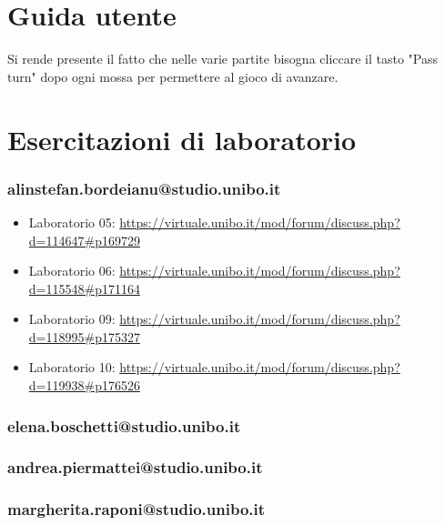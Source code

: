 \documentclass[a4paper,12pt]{report}
\begin{document}
\appendix

\chapter{Guida utente}

Si rende presente il fatto che nelle varie partite bisogna cliccare il tasto "Pass turn" dopo ogni mossa per permettere al gioco di avanzare.

\chapter{Esercitazioni di laboratorio}

\subsection{alinstefan.bordeianu@studio.unibo.it}

\begin{itemize}
	\item Laboratorio 05: \url{https://virtuale.unibo.it/mod/forum/discuss.php?d=114647#p169729}
	
	\item Laboratorio 06: \url{https://virtuale.unibo.it/mod/forum/discuss.php?d=115548#p171164}
	
	\item Laboratorio 09: \url{https://virtuale.unibo.it/mod/forum/discuss.php?d=118995#p175327}
	
	\item Laboratorio 10: \url{https://virtuale.unibo.it/mod/forum/discuss.php?d=119938#p176526}
\end{itemize}

\subsection{elena.boschetti@studio.unibo.it}

\subsection{andrea.piermattei@studio.unibo.it}

\subsection{margherita.raponi@studio.unibo.it}
\end{document}
